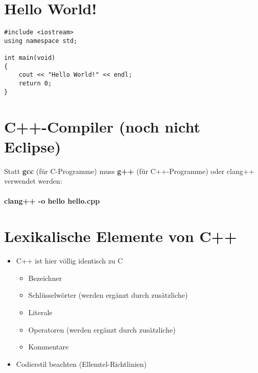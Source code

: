 \begin{multicols}{2}
\section{Hello World!}
\vspace{-\baselineskip}
\begin{minipage}{\linewidth}
\begin{lstlisting}
#include <iostream>
using namespace std;

int main(void)
{
	cout << "Hello World!" << endl;
	return 0;
}
\end{lstlisting}
\end{minipage}
\vfill\null
\columnbreak
\section{C++-Compiler (noch nicht Eclipse)}
Statt \textbf{gcc} (für C-Programme) muss \textbf{g++} (für C++-Programme) oder clang++ verwendet werden:\\

\\
\textbf{clang++ -o hello hello.cpp}
\flushleft
\vfill\null
\end{multicols}

\section{Lexikalische Elemente von C++}
\begin{itemize}
	\item C++ ist hier völlig identisch zu C
	\begin{itemize}
		\item Bezeichner
		\item Schlüsselwörter (werden ergänzt durch zusätzliche)
		\item Literale
		\item Operatoren (werden ergänzt durch zusätzliche)
		\item Kommentare
	\end{itemize}
	\item Codierstil beachten (Ellemtel-Richtlinien)
\end{itemize}

